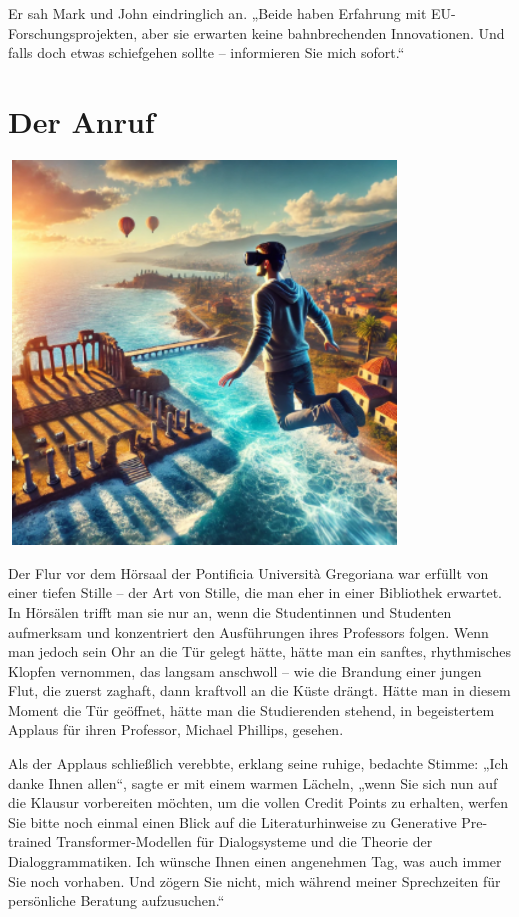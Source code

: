 \documentclass[
]{article}
\begin{document}
Er sah Mark und John eindringlich an. „Beide haben Erfahrung mit
EU-Forschungsprojekten, aber sie erwarten keine bahnbrechenden
Innovationen. Und falls doch etwas schiefgehen sollte -- informieren Sie
mich sofort.``

\section{Der Anruf}\label{der-anruf}

\includegraphics[width=4.09005in,height=4.01288in]{media/image11.png}

Der Flur vor dem Hörsaal der Pontificia Università Gregoriana war
erfüllt von einer tiefen Stille -- der Art von Stille, die man eher in
einer Bibliothek erwartet. In Hörsälen trifft man sie nur an, wenn die
Studentinnen und Studenten aufmerksam und konzentriert den Ausführungen
ihres Professors folgen. Wenn man jedoch sein Ohr an die Tür gelegt
hätte, hätte man ein sanftes, rhythmisches Klopfen vernommen, das
langsam anschwoll -- wie die Brandung einer jungen Flut, die zuerst
zaghaft, dann kraftvoll an die Küste drängt. Hätte man in diesem Moment
die Tür geöffnet, hätte man die Studierenden stehend, in begeistertem
Applaus für ihren Professor, Michael Phillips, gesehen.

Als der Applaus schließlich verebbte, erklang seine ruhige, bedachte
Stimme: „Ich danke Ihnen allen``, sagte er mit einem warmen Lächeln,
„wenn Sie sich nun auf die Klausur vorbereiten möchten, um die vollen
Credit Points zu erhalten, werfen Sie bitte noch einmal einen Blick auf
die Literaturhinweise zu Generative Pre-trained Transformer-Modellen für
Dialogsysteme und die Theorie der Dialoggrammatiken. Ich wünsche Ihnen
einen angenehmen Tag, was auch immer Sie noch vorhaben. Und zögern Sie
nicht, mich während meiner Sprechzeiten für persönliche Beratung
aufzusuchen.``
\end{document}
